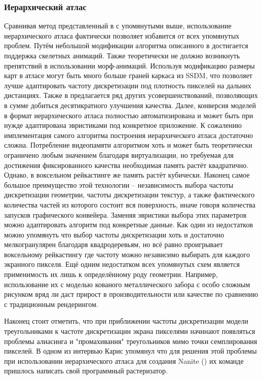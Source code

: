 \subsubsection{Иерархический атлас}
Сравнивая метод представленный в \cite{niski2007multi} с упомянутыми выше, использование иерархического атласа фактически позволяет избавится от всех упомянутых проблем. Путём небольшой модификации алгоритма описанного в \cite{feng2010feature} достигается поддержка скелетных анимаций. Также теоретически не должно возникнуть препятствий в использовании морф-анимаций. Используя модификацию \cite{feng2010feature} размеры карт в атласе могут быть много больше граней каркаса из SSDM, что позволяет лучше адаптировать частоту дискретизации под плотность пикселей на дальних дистанциях. Также в \cite{feng2010feature} предлагается ряд других усовершенствований, позволяющих в сумме добиться десятикратного улучшения качества. Далее, конверсия моделей в формат иерархического атласа полностью автоматизирована и может быть при нужде адаптирована эвристиками под конкретное приложение. К сожалению имплементация самого алгоритма построения иерархического атласа достаточно сложна. Потребление видеопамяти алгоритмом хоть и может быть теоретически ограничено любым значением благодаря виртуализации, но требуемая для достижения фиксированного качества необходимая память растёт квадратично. Однако, в воксельном рейкастинге же память растёт кубически. Наконец самое большое преимущество этой технологии -- независимость выбора частоты дискретизации геометрии, частоты дискретизации текстур, а также фактического количества частей из которого состоит вся поверхность, иначе говоря количества запусков графического конвейера. Заменяя эвристики выбора этих параметров можно адаптировать алгоритм под конкретные данные. Как один из недостатков можно упомянуть что выбор частоты дискретизации хоть и достаточно мелкогранулярен благодаря квадродеревьям, но всё равно проигрывает воксельному рейкастингу где частоту можно независимо выбирать для каждого экранного пикселя. Ещё одним недостатком всех упомянутых схем является применимость их лишь к определённому роду геометрии. Например, использование их с моделью кованого металлического забора с особо сложным рисунком вряд ли даст прирост в производительности или качестве по сравнению с традиционным рендерингом.

Наконец стоит отметить, что при приближении частоты дискретизации модели треугольниками к частоте дискретизации экрана пикселями начинают появляться проблемы алиасинга и "промахивания" треугольников мимо точки семплирования пикселей. В одном из интервью Карис упомянул что для решения этой проблемы при использовании иерархического атласа для создания Nanite (\cite{nanite}) их команде пришлось написать свой программный растеризатор.

